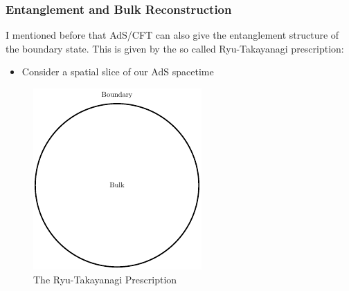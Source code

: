 \documentclass[8pt,aspectratio=169]{beamer}
\begin{document}
\begin{frame}
\frametitle{Entanglement and Bulk Reconstruction}

I mentioned before that AdS/CFT can also give the entanglement structure of the boundary state. This is given by the so called Ryu-Takayanagi prescription: 

\begin{minipage}[t]{0.55\linewidth}

\begin{itemize}

\item Consider a spatial slice of our AdS spacetime

\end{itemize}

\end{minipage}\hfill
%
\begin{minipage}[t]{0.44\linewidth}

\begin{figure}
    \begin{center}
    
        \includegraphics[scale=1]{RT0}    
    
    \end{center}
    \caption{The Ryu-Takayanagi Prescription}
    \label{fig:WDW}
\end{figure}

\end{minipage}

\end{frame}
\end{document}
